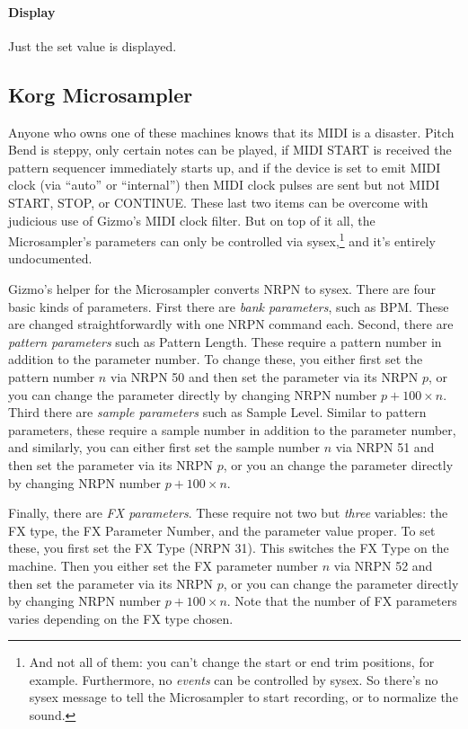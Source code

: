 \documentclass{article}
\begin{document}
\paragraph{Display} Just the set value is displayed.


\subsection{Korg Microsampler}  Anyone who owns one of these machines knows that its MIDI is a disaster.  Pitch Bend is steppy, only certain notes can be played, if MIDI START is received the pattern sequencer immediately starts up, and if the device is set to emit MIDI clock (via ``auto'' or ``internal'') then MIDI clock pulses are sent but not MIDI START, STOP, or CONTINUE.  These last two items can be overcome with judicious use of Gizmo's MIDI clock filter.  But on top of it all, the Microsampler's parameters can only be controlled via sysex,\footnote{And not all of them: you can't change the start or end trim positions, for example.  Furthermore, no {\it events} can be controlled by sysex.  So there's no sysex message to tell the Microsampler to start recording, or to normalize the sound.} and it's entirely undocumented. 

Gizmo's helper for the Microsampler converts NRPN to sysex.  There are four basic kinds of parameters.  First there are {\it bank parameters}, such as BPM.  These are changed straightforwardly with one NRPN command each.  Second, there are {\it pattern parameters} such as Pattern Length.  These require a pattern number in addition to the parameter number.  To change these, you either first set the pattern number \(n\) via NRPN 50 and then set the parameter via its NRPN \(p\), or you can change the parameter  directly by changing NRPN number \(p + 100 \times n\).  Third there are {\it sample parameters} such as Sample Level.  Similar to pattern parameters, these require a sample number in addition to the parameter number, and similarly, you can either first set the sample number \(n\) via NRPN 51 and then set the parameter via its NRPN \(p\), or you an change the parameter directly by changing NRPN number \(p + 100 \times n\).  

Finally, there are {\it FX parameters}.  These require not two but {\it three} variables: the FX type, the FX Parameter Number, and the parameter value proper.  To set these, you first set the FX Type (NRPN 31).  This switches the FX Type on the machine.  Then you either set the FX parameter number \(n\) via NRPN 52 and then set the parameter via its NRPN \(p\), or you can change the parameter directly by changing NRPN number \(p + 100 \times n\).  Note that the number of FX parameters varies depending on the FX type chosen.
\end{document}
